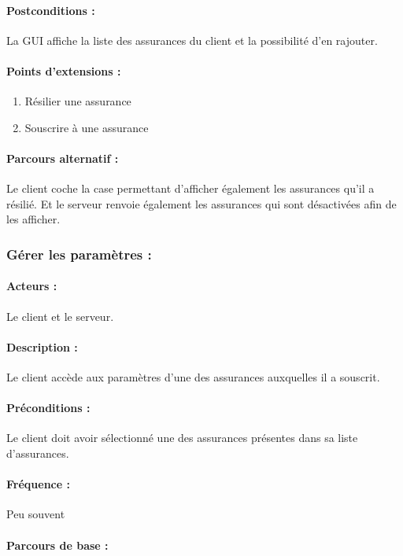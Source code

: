 \documentclass[../annexe.tex]{subfiles}
\begin{document}
\paragraph{Postconditions :} La GUI affiche la liste des assurances du client et la possibilité d'en rajouter.

\paragraph{Points d'extensions :} 
\begin{enumerate}
	\item Résilier une assurance
	\item Souscrire à une assurance
\end{enumerate}

\paragraph{Parcours alternatif :}
		Le client coche la case permettant d'afficher également les assurances qu'il a résilié. Et le serveur renvoie également les assurances qui sont désactivées 
		afin de les afficher.
\newpage

\subsubsection{Gérer les paramètres :}

\paragraph{Acteurs :} Le client et le serveur.

\paragraph{Description :} Le client accède aux paramètres d'une des assurances auxquelles il a souscrit. 

\paragraph{Préconditions :} Le client doit avoir sélectionné une des assurances présentes dans sa liste d'assurances.

\paragraph{Fréquence :} Peu souvent

\paragraph{Parcours de base :}
\end{document}
